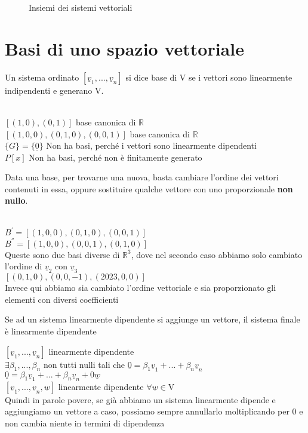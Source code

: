 \begin{figure}[H]
	\centering
	\caption[Caption]{Insiemi dei sistemi vettoriali}
	\label{fig:insiemisistemivett}
\end{figure}

\section{Basi di uno spazio vettoriale}

Un sistema ordinato $[\underline{v}_1,...,\underline{v}_n]$ si dice base di V se i vettori sono linearmente indipendenti e generano V.
\begin{nota}
	\phantom{}\\
	$[(1,0),(0,1)]$ base canonica di $\mathbb{R}$\\
	$[(1,0,0),(0,1,0),(0,0,1)]$ base canonica di $\mathbb{R}$\\
	$\{G\}=\{\underline{0}\}$ Non ha basi, perché i vettori sono linearmente dipendenti\\
	$P[x]$ Non ha basi, perché non è finitamente generato
\end{nota}

Data una base, per trovarne una nuova, basta cambiare l'ordine dei vettori contenuti in essa, oppure sostituire qualche vettore con uno proporzionale \textbf{non nullo}.

\begin{es}
	\phantom{}\\
	$B^{'}=[(1,0,0),(0,1,0),(0,0,1)]$\\
	$B^{''}=[(1,0,0),(0,0,1),(0,1,0)]$\\
	Queste sono due basi diverse di $\mathbb{R}^3$, dove nel secondo caso abbiamo solo cambiato l'ordine di $\underline{v}_2$ con $\underline{v}_3$\\
	$[(0,1,0),(0,0,-1),(2023,0,0)]$\\
	Invece qui abbiamo sia cambiato l'ordine vettoriale e sia proporzionato gli elementi con diversi coefficienti
\end{es}

\begin{nota}[DIP+1=DIP]
	Se ad un sistema linearmente dipendente si aggiunge un vettore, il sistema finale è linearmente dipendente
	\begin{dimostrazione}
		$[\underline{v}_1,...,\underline{v}_n]$ linearmente dipendente\\
		$\exists\beta_1,...,\beta_n$ non tutti nulli tali che $\underline{0}=\beta_1\underline{v}_1+...+\beta_n\underline{v}_n$\\
		$\underline{0}=\beta_1\underline{v}_1+...+\beta_n\underline{v}_n+0\underline{w}$\\
		$[\underline{v}_1,...,\underline{v}_n,\underline{w}]$ linearmente dipendente $\forall\underline{w}\in$V\\
		Quindi in parole povere, se già abbiamo un sistema linearmente dipende e aggiungiamo un vettore a caso, possiamo sempre annullarlo moltiplicando per 0 e non cambia niente in termini di dipendenza
	\end{dimostrazione}
\end{nota}

